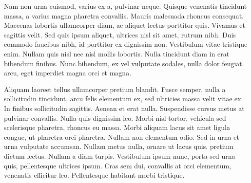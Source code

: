 \documentclass[11pt,english,]{memoir}
\newcommand{\CoverName}{cover} %
\begin{document}
Nam non urna euismod, varius ex a, pulvinar neque. Quisque venenatis tincidunt massa, a varius magna pharetra convallis. Mauris malesuada rhoncus consequat. Maecenas lobortis ullamcorper diam, ac aliquet lectus porttitor quis. Vivamus et sagittis velit. Sed quis ipsum aliquet, ultrices nisl sit amet, rutrum nibh. Duis commodo faucibus nibh, id porttitor ex dignissim non. Vestibulum vitae tristique enim. Nullam quis nisl nec nisl mollis lobortis. Nulla tincidunt diam in erat bibendum finibus. Nunc bibendum, ex vel vulputate sodales, nulla dolor feugiat arcu, eget imperdiet magna orci et magna.

Aliquam laoreet tellus ullamcorper pretium blandit. Fusce semper, nulla a sollicitudin tincidunt, arcu felis elementum ex, sed ultricies massa velit vitae ex. In finibus sollicitudin sagittis. Aenean et erat nulla. Suspendisse cursus metus at pulvinar convallis. Nulla quis dignissim leo. Morbi nisl tortor, vehicula sed scelerisque pharetra, rhoncus eu massa. Morbi aliquam lacus sit amet ligula congue, ut pharetra orci pharetra. Nullam non elementum odio. Sed in urna et urna vulputate accumsan. Nullam metus nulla, ornare ut lacus quis, pretium dictum lectus. Nullam a diam turpis. Vestibulum ipsum nunc, porta sed urna quis, pellentesque ultrices ipsum. Cras sem dui, convallis at orci elementum, venenatis efficitur leo. Pellentesque habitant morbi tristique.

\cleardoublepage
\pagestyle{empty}
\renewcommand{\thepage}{\CoverName}


\printbibliography
\end{document}

